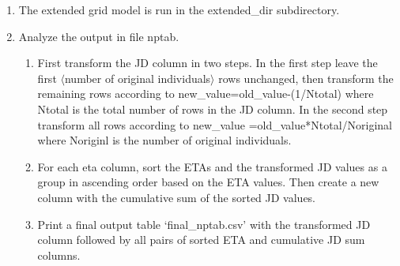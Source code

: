 \begin{enumerate}
\begin{enumerate}
		\end{enumerate}
		\item The extended grid model is run in the extended\_dir subdirectory.
		\item Analyze the output in file nptab. 
		\begin{enumerate}
			\item First transform the JD column in two steps. In the first step leave the first $\langle$number of original individuals$\rangle$ rows unchanged, then transform the remaining rows according to new\_value=old\_value-(1/Ntotal) where Ntotal is the total number of rows in the JD column. In the second step transform all rows according to new\_value =old\_value*Ntotal/Noriginal where Noriginl is the number of original individuals.
			\item For each eta column,  sort the ETAs and the transformed JD values as a group in ascending order based on the ETA values. Then create a new column with the cumulative sum of the sorted JD values.
																																				  
																																			   
															 
			\item Print a final output table ‘final\_nptab.csv’ with the transformed JD column followed by all pairs of sorted ETA and cumulative  JD sum columns.
		\end{enumerate}
	\end{enumerate}
	
	

